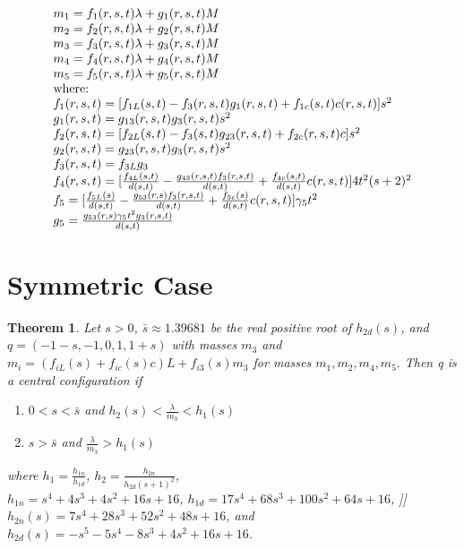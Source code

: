 \documentclass[11pt,leqno]{article}
\newtheorem{theorem}{Theorem}[section]
\theoremstyle{definition}
\theoremstyle{remark}
\numberwithin{equation}{section}
\begin{document}
\begin{equation}\begin{array}{l}
m_{1}=f_{1}(r,s,t)\lambda+g_{1}(r,s,t)M \\
m_{2}=f_{2}(r,s,t)\lambda+g_{2}(r,s,t)M \\
m_{3}=f_{3}(r,s,t)\lambda+g_{3}(r,s,t)M \\
m_{4}=f_{4}(r,s,t)\lambda+g_{4}(r,s,t)M \\
m_{5}=f_{5}(r,s,t)\lambda+g_{5}(r,s,t)M \\
$where:$ \\
f_{1}(r,s,t)=[f_{1L}(s,t)-f_{3}(r,s,t)g_{1}(r,s,t)+f_{1c}(s,t)c(r,s,t)]s^{2} \\
g_{1}(r,s,t)=g_{13}(r,s,t)g_{3}(r,s,t)s^{2} \\
f_{2}(r,s,t)=[f_{2L}(s,t)-f_{3}(s,t)g_{23}(r,s,t)+f_{2c}(r,s,t)c]s^{2} \\
g_{2}(r,s,t)=g_{23}(r,s,t)g_{3}(r,s,t)s^{2} \\
f_{3}(r,s,t)=f_{3L}g_{3} \\
f_{4}(r,s,t)=[\frac{f_{4L}(s,t)}{d(s,t)}-\frac{g_{43}(r,s,t)f_{3}(r,s,t)}{d(s,t)}+\frac{f_{4c}(s,t)}{d(s,t)}c(r,s,t)]4t^{2}(s+2)^{2} \\
f_{5}=[\frac{f_{5L}(s)}{d(s,t)}-\frac{g_{53}(r,s)f_{3}(r,s,t)}{d(s,t)}+\frac{f_{5c}(s)}{d(s,t)}c(r,s,t)]\gamma_{5}t^{2} \\
g_{5}=\frac{g_{53}(r,s)\gamma_{5}t^{2}g_{3}(r,s,t)}{d(s,t)} \\
\end{array}
\end{equation}



\section{Symmetric Case}

\begin{theorem}

\emph{Let $s>0$, $\bar{s}\approx1.39681$ be the
real positive root of $h_{2d}(s)$, and $q=(-1-s,-1,0,1,1+s)$ with
masses $m_{3}$ and $m_{i}=(f_{iL}(s)+f_{ic}(s)c)L+f_{i3}(s)m_{3}$
for masses $m_{1},m_{2},m_{4},m_{5}.$ Then q is a central configuration
if}
\begin{enumerate}
\item \emph{$0<s<\bar{s}$ and $h_{2}(s)<\frac{\lambda}{m_{3}}<h_{1}(s)$}
\item \emph{$s>\bar{s}$ and $\frac{\lambda}{m_{3}}>h_{1}(s)$}
\end{enumerate}
where $h_{1}=\frac{h_{1n}}{h_{1d}}$, $h_{2}=\frac{h_{2n}}{h_{2d}(s+1)^{2}}$, \\
$h_{1n}=s^{4}+4s^{3}+4s^{2}+16s+16$, $h_{1d}=17s^{4}+68s^{3}+100s^{2}+64s+16$, ]]
$h_{2n}(s)=7s^{4}+28s^{3}+52s^{2}+48s+16$, and $h_{2d}(s)=-s^{5}-5s^{4}-8s^{3}+4s^{2}+16s+16$.
\end{theorem}
\end{document}
